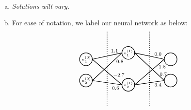 \documentclass[11pt,letterpaper]{article}
\begin{document}
\sol 
\begin{enumerate}[(a)]
\item {\itshape Solutions will vary.} \pspace

\item For ease of notation, we label our neural network as below:
		\[
		\begin{tikzpicture}[scale=1.1]
		\draw[line width=0.03cm] (0,0.2) circle (0.3);
		\draw[line width=0.03cm] (0,1.2) circle (0.3);
		
		\draw[line width=0.03cm] (2,0) circle (0.3);
		\draw[line width=0.03cm] (2,1.5) circle (0.3);
		
		\draw[line width=0.03cm] (4,0.2) circle (0.3);
		\draw[line width=0.03cm] (4,1.2) circle (0.3);
		
		\draw[line width=0.03cm,dotted] (1,-1) -- (1,2.5);
		\draw[line width=0.03cm,dotted] (3,-1) -- (3,2.5);
		
		\draw[line width=0.03cm] (0.3,1.2) -- (1.7,1.5);
		\draw[line width=0.03cm] (0.3,1.2) -- (1.7,0);
		\draw[line width=0.03cm] (0.3,0.2) -- (1.7,1.5);
		\draw[line width=0.03cm] (0.3,0.2) -- (1.7,0);
		
		\draw[line width=0.03cm] (2.3,1.5) -- (3.7,1.2);
		\draw[line width=0.03cm] (2.3,1.5) -- (3.7,0.2);
		\draw[line width=0.03cm] (2.3,0) -- (3.7,1.2);
		\draw[line width=0.03cm] (2.3,0) -- (3.7,0.2);
		
		\node at (1.35,1.6) {\scriptsize$1.1$};
		\node at (1.6,1.1) {\scriptsize$0.8$};
		\node at (1.55,0.45) {\scriptsize$-2.7$};
		\node at (1.4,-0.15) {\scriptsize$0.6$};
		
		\node at (3.4,1.45) {\scriptsize$0.0$};
		\node at (3.6,0.85) {\scriptsize$1.8$};
		\node at (3.65,0.5) {\scriptsize$0.7$};
		\node at (3.4,0) {\scriptsize$3.4$};
		
		\node at (0.02,1.2) {\tiny$n^{(0)}_1$};
		\node at (0.02,0.2) {\tiny$n^{(0)}_2$};
		
		\node at (2,1.5) {\tiny$n^{(1)}_1$};
		\node at (2,0) {\tiny$n^{(1)}_2$};
		

\end{tikzpicture}\]
\end{enumerate}
\end{document}
